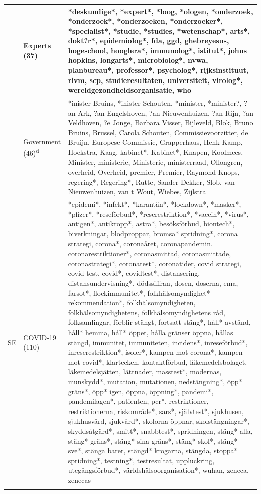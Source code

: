 \documentclass[
]{ccr}
\begin{document}
{\begin{spacing}{.9}
\begin{longtable}[]{@{}
  >{\raggedright\arraybackslash}p{.09\linewidth}
  >{\raggedright\arraybackslash}p{.12\linewidth}
  >{\raggedright\arraybackslash}p{.71\linewidth}@{}}
& Experts (37) & *deskundige*, *expert*, *loog, *ologen, *onderzoek,
*onderzoek*, *onderzoeken, *onderzoeker*, *specialist*, *studie,
*studies, *wetenschap*, arts*, dokt?r*, epidemiolog*, fda, ggd,
ghebreyesus, hogeschool, hooglera*, immunolog*, istitut*, johns hopkins,
longarts*, microbiolog*, nvwa, planbureau*, professor*, psycholog*,
rijksinstituut, rivm, scp, studieresultaten, universiteit, virolog*,
wereldgezondheidsorganisatie, who \\ \cline{2-3}

& Government (46)\textsuperscript{d} & *inister Bruins, *inister
Schouten, *minister, *minister?, ?an Ark, ?an Engelshoven, ?an
Nieuwenhuizen, ?an Rijn, ?an Veldhoven, ?e Jonge, Barbara Visser,
Bijleveld, Blok, Bruno Bruins, Brussel, Carola Schouten,
Commissievoorzitter, de Bruijn, Europese Commissie, Grapperhaus, Henk
Kamp, Hoekstra, Kaag, kabinet*, Kabinet*, Knapen, Koolmees, Minister,
ministerie, Ministerie, ministerraad, Ollongren, overheid, Overheid,
premier, Premier, Raymond Knops, regering*, Regering*, Rutte, Sander
Dekker, Slob, van Nieuwenhuizen, van t Wout, Wiebes, Zijlstra \\ \cline{1-3}

SE & COVID-19 (110) & *epidemi*, *infekt*, *karantän*, *lockdown*,
*masker*, *pfizer*, *reseförbud*, *reserestriktion*, *vaccin*, *virus*,
antigen*, antikropp*, astra*, besöksförbud, biontech*, biverkningar,
blodproppar, bromsa* spridning*, corona strategi, corona*, coronaåret,
coronapandemin, coronarestriktioner*, coronasmittad, coronasmittade,
coronastrategi*, coronatest*, coronatider, covid strategi, covid test,
covid*, covidtest*, distansering, distansundervisning*, dödssiffran,
dosen, doserna, ema, farsot*, flockimmunitet*, folkhälsomyndighet*
rekommendation*, folkhälsomyndigheten, folkhälsomyndighetens,
folkhälsomyndighetens råd, folksamlingar, förblir stängt, fortsatt
stäng*, håll* avstånd, håll* hemma, håll* öppet, hålla gränser öppna,
hållas stängd, immunitet, immuniteten, incidens*, inreseförbud*,
inreserestriktion*, isoler*, kampen mot corona*, kampen mot covid*,
klartecken, kontaktförbud, läkemedelsbolaget, läkemedelsjätten,
lättnader, masstest*, modernas, munskydd*, mutation, mutationen,
nedstängning*, öpp* gräns*, öpp* igen, öppna, öppning*, pandemi*,
pandemilagen*, patienten, pcr*, restriktioner, restriktionerna,
riskområde*, sars*, självtest*, sjukhusen, sjukhusvård, sjukvård*,
skolorna öppnar, skolstängningar*, skyddsåtgärd*, smitt*, snabbtest*,
spridningen, stäng* alla, stäng* gräns*, stäng* sina gräns*, stäng*
skol*, stäng* sve*, stänga barer, stängd* krogarna, stängda, stoppa*
spridning*, testning*, testresultat, uppluckring, utegångsförbud*,
världshälsoorganisation*, wuhan, zeneca, zenecas \\ \cline{2-3}


\end{longtable}
\end{spacing}}
\end{document}
